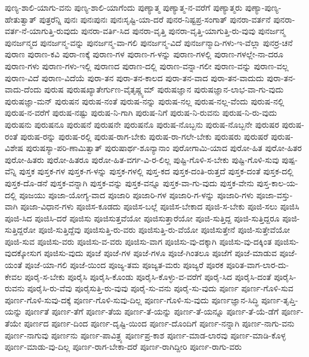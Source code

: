 {ಪುಣ್ಯ-ಶಾಲಿ-ಯಾಗು-ವನು
ಪುಣ್ಯ-ಶಾಲಿ-ಯಾಗೆಂದು
ಪುಣ್ಯಾತ್ಮ
ಪುಣ್ಯಾತ್ಮ-ನ-ವರೆಗೆ
ಪುಣ್ಯಾತ್ಮರು
ಪುಣ್ಯಾ-ಪುಣ್ಯ-ಹೇತುತ್ವಾತ್
ಪುತ್ರರೆನ್ನಿ
ಪುನಃ
ಪುನಃಪುನಃ
ಪುನಃಸೃಷ್ಟಿ-ಯಾ-ದರೆ
ಪುನರ-ನಿಷ್ಟಪ್ರ-ಸಂಗಾತ್
ಪುನರಾ-ವರ್ತನೆ
ಪುನರಾ-ವರ್ತ-ನೆ-ಯಾಗುತ್ತಿ-ರುವುದು
ಪುನರಾ-ವರ್ತಿ-ಸಿದ
ಪುನರಾ-ವೃತ್ತಿ
ಪುನರಾ-ವೃತ್ತಿ-ಯಾಗುತ್ತಿ-ರು-ವುವು
ಪುನರ್ಜನ್ಮ
ಪುನರ್ಜನ್ಮದ
ಪುನರ್ಜನ್ಮ-ವನ್ನು
ಪುನರ್ಜನ್ಮ-ವಾ-ಗಲಿ
ಪುನರ್ಜನ್ಮ-ವಿದೆ
ಪುನರ್ಜನ್ಮಾದಿ-ಗಳು-ಇ-ವೆಲ್ಲಾ
ಪುನರ್ರ-ಚನೆ
ಪುರಾಣ
ಪುರಾಣ-ಕವಿ
ಪುರಾ-ಣಕ್ಕೆ
ಪುರಾಣ-ಗಳ
ಪುರಾಣ-ಗ-ಳನ್ನು
ಪುರಾಣ-ಗಳಲ್ಲಿ
ಪುರಾಣ-ಗಳಲ್ಲೇ-ನಾ-ದರೂ
ಪುರಾಣ-ಗಳು
ಪುರಾಣ-ಗಳು-ಇಲ್ಲಿ
ಪುರಾಣದ
ಪುರಾಣ-ದಲ್ಲಿ
ಪುರಾಣ-ವನ್ನಾ-ಗಲೀ
ಪುರಾಣ-ವನ್ನು
ಪುರಾಣ-ವಲ್ಲ
ಪುರಾಣ-ವಿದೆ
ಪುರಾಣ-ವಿದೆಯೆ
ಪುರಾ-ತನ
ಪುರಾ-ತನ-ಕಾಲದ
ಪುರಾ-ತನ-ವಾದ
ಪುರಾ-ತನ-ವಾದುದು
ಪುರಾ-ತನ-ವಾದು-ದೆಂದು
ಪುರುಷ
ಪುರುಷಖ್ಯಾತೇರ್ಗುಣ-ವೈತೃಷ್ಣ್ಯಮ್
ಪುರುಷಜ್ಞಾನ
ಪುರುಷಜ್ಞಾನ-ಲಾಭ-ವಾ-ಗು-ವುದು
ಪುರುಷಜ್ಞಾ-ಮನ್
ಪುರುಷನ
ಪುರುಷ-ನಂತೆ
ಪುರುಷ-ನನ್ನು
ಪುರುಷ-ನಲ್ಲ
ಪುರುಷ-ನಲ್ಲ-ವೆಂದು
ಪುರುಷ-ನಲ್ಲಿ
ಪುರುಷ-ನ-ವರೆಗೆ
ಪುರುಷ-ನಷ್ಟು
ಪುರುಷ-ನಿ-ಗಾಗಿ
ಪುರುಷ-ನಿಗೆ
ಪುರುಷ-ನಿ-ರುವನು
ಪುರುಷ-ನಿ-ರು-ವುದು
ಪುರುಷನು
ಪುರುಷನೂ
ಪುರುಷನೆ
ಪುರುಷನೇ
ಪುರುಷನೊ
ಪುರುಷ-ನೊಬ್ಬನು
ಪುರುಷ-ನೊಬ್ಬನೇ
ಪುರುಷರ
ಪುರುಷ-ರಂತೆ
ಪುರುಷ-ರನ್ನು
ಪುರುಷ-ರಲ್ಲಿ
ಪುರುಷ-ರಾಗ-ಬೇಕು
ಪುರುಷ-ರಾ-ಗಲೇ-ಬೇಕು
ಪುರುಷರು
ಪುರುಷರೆ
ಪುರುಷ-ವಿಶೇಷ
ಪುರುಷಸ್ಯಾ-ಪರಿ-ಣಾಮಿತ್ವಾತ್
ಪುರುಷಾರ್ಥ-ಶೂನ್ಯಾನಾಂ
ಪುರೋಗಾಮಿ-ಯಾದ
ಪುರೋ-ಹಿತ
ಪುರೋ-ಹಿತರ
ಪುರೋ-ಹಿತರು
ಪುರೋ-ಹಿತರೂ
ಪುರೋ-ಹಿತ-ವರ್ಗ-ವಿ-ರ-ಲಿಲ್ಲ
ಪುಷ್ಟಿ-ಗೊಳಿ-ಸ-ಬೇಕು
ಪುಷ್ಟಿ-ಗೊಳಿ-ಸುವು
ಪುಷ್ಪ-ವೆನ್ನಿ
ಪುಸ್ತಕ
ಪುಸ್ತಕ-ಗಳ
ಪುಸ್ತಕ-ಗ-ಳನ್ನು
ಪುಸ್ತಕ-ಗಳಲ್ಲಿ
ಪುಸ್ತ-ಕದ
ಪುಸ್ತಕ-ದಂತಿ-ರುತ್ತದೆ
ಪುಸ್ತಕ-ದಂತೆ
ಪುಸ್ತಕ-ದಲ್ಲಿ
ಪುಸ್ತಕ-ದೊ-ಡನೆ
ಪುಸ್ತಕ-ವನ್ನಾಗಿ
ಪುಸ್ತಕ-ವನ್ನು
ಪುಸ್ತಕ-ವನ್ನೂ
ಪುಸ್ತಕ-ವಾ-ಗು-ವುದು
ಪುಸ್ತಕ-ವೇನು
ಪುಸ್ತ-ಕಾಲ-ಯ-ದಲ್ಲಿ
ಪೂಜಯು
ಪೂಜಾ-ಯೋಗ್ಯ-ವಾದ
ಪೂಜಾರಿ
ಪೂಜಾರಿ-ಗಳ
ಪೂಜಾರಿ-ಗ-ಳನ್ನು
ಪೂಜಾರಿ-ಗಳು
ಪೂಜಾ-ವಸ್ತು-ವಾಗಿ
ಪೂಜಾ-ವಿಧಾನ-ಗಳು
ಪೂಜಿಸ-ಕೂಡದು
ಪೂಜಿಸ-ಬಲ್ಲೆ
ಪೂಜಿಸ-ಬೇಕಾದ
ಪೂಜಿ-ಸ-ಬೇಕು
ಪೂಜಿ-ಸಲು
ಪೂಜಿಸಿ
ಪೂಜಿ-ಸಿದ
ಪೂಜಿಸಿ-ದರೆ
ಪೂಜಿಸು
ಪೂಜಿಸುತ್ತವೆಯೋ
ಪೂಜಿಸುತ್ತಾರೆಯೋ
ಪೂಜಿ-ಸುತ್ತಿದ್ದ
ಪೂಜಿ-ಸುತ್ತಿದ್ದರೂ
ಪೂಜಿ-ಸುತ್ತಿದ್ದರೋ
ಪೂಜಿ-ಸುತ್ತಿದ್ದೆವು
ಪೂಜಿಸುತ್ತಿ-ರು-ವರು
ಪೂಜಿಸುತ್ತಿ-ರು-ವೆಯೋ
ಪೂಜಿಸುತ್ತೇನೆ
ಪೂಜಿ-ಸುತ್ತೇವೆಯೋ
ಪೂಜಿ-ಸುವ
ಪೂಜಿಸು-ವರು
ಪೂಜಿಸು-ವ-ವರು
ಪೂಜಿಸು-ವಾಗ
ಪೂಜಿಸು-ವು-ದಕ್ಕಾಗಿ
ಪೂಜಿಸು-ವು-ದಕ್ಕಿಂತ
ಪೂಜಿಸು-ವುದಕ್ಕೋಸುಗ
ಪೂಜಿಸು-ವುದು
ಪೂಜೆ
ಪೂಜೆ-ಗಳ
ಪೂಜೆ-ಗಳೂ
ಪೂಜೆ-ಗಿಂತಲೂ
ಪೂಜೆಗೆ
ಪೂಜೆ-ಮಾಡುವ
ಪೂಜೆ-ಯಂತೆ
ಪೂಜೆ-ಯಾ-ಗಲಿ
ಪೂಜೆ-ಯಿಂದ
ಪೂಜ್ಯ-ತಮ
ಪೂಜ್ಯತ-ಮರು
ಪೂಜ್ಯರೆ
ಪೂರಕ
ಪೂರಿತ-ವಾಗ-ಲಾರ-ದು-ಕೇವಲ
ಪೂರೈ-ಸ-ಬೇಕು
ಪೂರೈಸಿ
ಪೂರೈಸಿ-ಕೊಂಡು
ಪೂರೈಸಿ-ಕೊಳ್ಳು-ವ-ವರೆಗೆ
ಪೂರೈ-ಸಿದ
ಪೂರೈಸಿ-ದಂತೆ
ಪೂರೈಸಿ-ರುವನು
ಪೂರೈಸಿ-ರು-ವೆವು
ಪೂರೈಸುತ್ತಿ-ರು-ವುವು
ಪೂರೈ-ಸು-ವನು
ಪೂರೈ-ಸು-ವುದು
ಪೂರ್ಣ
ಪೂರ್ಣ-ಗೊಳಿ-ಸುವ
ಪೂರ್ಣ-ಗೊಳಿ-ಸುವು-ದಕ್ಕೆ
ಪೂರ್ಣ-ಗೊಳಿ-ಸುವು-ದಿಲ್ಲ
ಪೂರ್ಣ-ಗೊಳಿ-ಸು-ವುದು
ಪೂರ್ಣಜ್ಞಾನ-ಸಿದ್ಧಿ
ಪೂರ್ಣ-ತೃಪ್ತಿ-ಯನ್ನು
ಪೂರ್ಣತೆ
ಪೂರ್ಣ-ತೆಗೆ
ಪೂರ್ಣ-ತೆಯ
ಪೂರ್ಣ-ತೆ-ಯನ್ನು
ಪೂರ್ಣ-ತೆ-ಯನ್ನೂ
ಪೂರ್ಣ-ತೆ-ಯೆ-ಡೆಗೆ
ಪೂರ್ಣ-ತೆಯೇ
ಪೂರ್ಣದ
ಪೂರ್ಣ-ದಿಂದ
ಪೂರ್ಣ-ದೃಷ್ಟಿ-ಯಿಂದ
ಪೂರ್ಣ-ದೊಂದಿಗೆ
ಪೂರ್ಣ-ನನ್ನಾಗಿ
ಪೂರ್ಣ-ನಾಗು-ವನು
ಪೂರ್ಣ-ನಾಗುವು
ಪೂರ್ಣನು
ಪೂರ್ಣ-ಪಾವಿತ್ರ್ಯ
ಪೂರ್ಣಪ್ರ-ಕಾಶ
ಪೂರ್ಣ-ಮಾಡ-ಲಾರವು
ಪೂರ್ಣ-ಮಾಡಿ-ಕೊಳ್ಳ
ಪೂರ್ಣ-ಮಾಡು-ವು-ದಿಲ್ಲ
ಪೂರ್ಣ-ರಾಗ-ಬೇಕಾ-ದರೆ
ಪೂರ್ಣ-ರಾಗಿದ್ದೀರಿ
ಪೂರ್ಣ-ರಾಗು-ವರು
}
